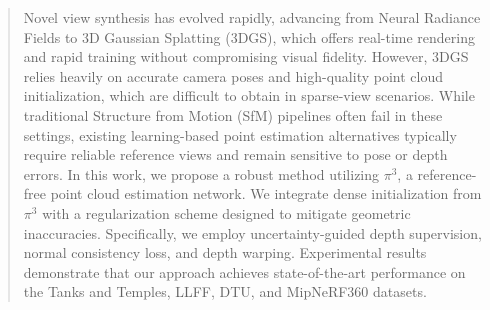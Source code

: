 \begin{abstract}
Novel view synthesis has evolved rapidly, advancing from Neural Radiance Fields to 3D Gaussian Splatting (3DGS), which offers real-time rendering and rapid training without compromising visual fidelity. However, 3DGS relies heavily on accurate camera poses and high-quality point cloud initialization, which are difficult to obtain in sparse-view scenarios. While traditional Structure from Motion (SfM) pipelines often fail in these settings, existing learning-based point estimation alternatives typically require reliable reference views and remain sensitive to pose or depth errors. In this work, we propose a robust method utilizing $\pi^3$, a reference-free point cloud estimation network. We integrate dense initialization from $\pi^3$ with a regularization scheme designed to mitigate geometric inaccuracies. Specifically, we employ uncertainty-guided depth supervision, normal consistency loss, and depth warping. Experimental results demonstrate that our approach achieves state-of-the-art performance on the Tanks and Temples, LLFF, DTU, and MipNeRF360 datasets.

\end{abstract}